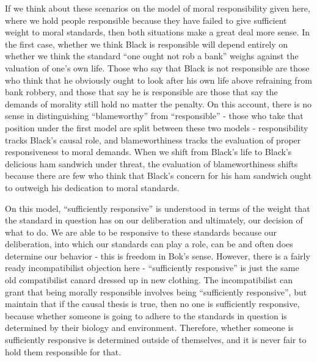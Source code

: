 \documentclass[phd,12pt,oneside,paper=letterpaper]{ubcthesis}
\begin{document}
If we think about these scenarios on the model of moral responsibility given here, where we hold people responsible because they have failed to give sufficient weight to moral standards, then both situations make a great deal more sense. In the first case, whether we think Black is responsible will depend entirely on whether we think the standard ``one ought not rob a bank'' weighs against the valuation of one's own life. Those who say that Black is not responsible are those who think that he obviously ought to look after his own life above refraining from bank robbery, and those that say he is responsible are those that say the demands of morality still hold no matter the penalty. On this account, there is no sense in distinguishing ``blameworthy'' from ``responsible'' - those who take that position under the first model are split between these two models - responsibility tracks Black's causal role, and blameworthiness tracks the evaluation of proper responsiveness to moral demands. When we shift from Black's life to Black's delicious ham sandwich under threat, the evaluation of blameworthiness shifts because there are few who think that Black's concern for his ham sandwich ought to outweigh his dedication to moral standards.

On this model, ``sufficiently responsive'' is understood in terms of the weight that the standard in question has on our deliberation and ultimately, our decision of what to do. We are able to be responsive to these standards because our deliberation, into which our standards can play a role, can be and often does determine our behavior - this is freedom in Bok's sense. However, there is a fairly ready incompatibilist objection here - ``sufficiently responsive'' is just the same old compatibilist canard dressed up in new clothing. The incompatibilist can grant that being morally responsible involves being ``sufficiently responsive'', but maintain that if the causal thesis is true, then no one is sufficiently responsive, because whether someone is going to adhere to the standards in question is determined by their biology and environment. Therefore, whether someone is sufficiently responsive is determined outside of themselves, and it is never fair to hold them responsible for that. 
\end{document}
